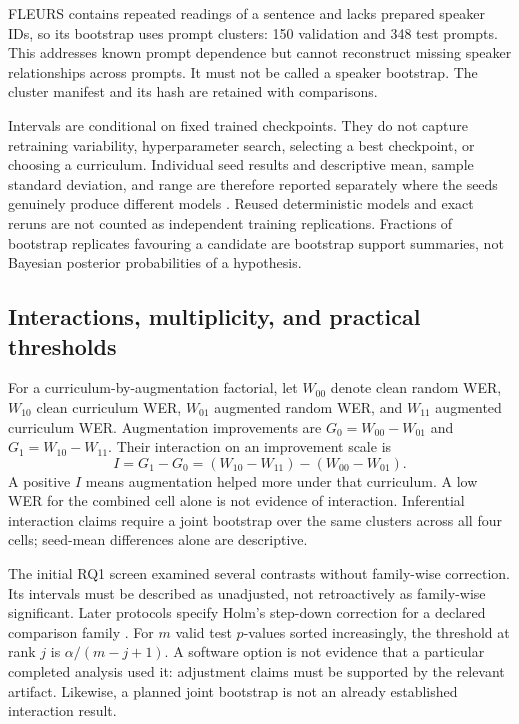 \documentclass[12pt,a4paper]{report}
\newcommand{\code}[1]{\texttt{\detokenize{#1}}}
\begin{document}
FLEURS contains repeated readings of a sentence and lacks prepared speaker IDs, so its bootstrap uses \code{source_id} prompt clusters: 150 validation and 348 test prompts. This addresses known prompt dependence but cannot reconstruct missing speaker relationships across prompts. It must not be called a speaker bootstrap. The cluster manifest and its hash are retained with comparisons.

Intervals are conditional on fixed trained checkpoints. They do not capture retraining variability, hyperparameter search, selecting a best checkpoint, or choosing a curriculum. Individual seed results and descriptive mean, sample standard deviation, and range are therefore reported separately where the seeds genuinely produce different models \citep{Reimers2017}. Reused deterministic models and exact reruns are not counted as independent training replications. Fractions of bootstrap replicates favouring a candidate are bootstrap support summaries, not Bayesian posterior probabilities of a hypothesis.

\subsection{Interactions, multiplicity, and practical thresholds}

For a curriculum-by-augmentation factorial, let $W_{00}$ denote clean random WER, $W_{10}$ clean curriculum WER, $W_{01}$ augmented random WER, and $W_{11}$ augmented curriculum WER. Augmentation improvements are $G_0=W_{00}-W_{01}$ and $G_1=W_{10}-W_{11}$. Their interaction on an improvement scale is
\begin{equation}I=G_1-G_0=(W_{10}-W_{11})-(W_{00}-W_{01}).\end{equation}
A positive $I$ means augmentation helped more under that curriculum. A low WER for the combined cell alone is not evidence of interaction. Inferential interaction claims require a joint bootstrap over the same clusters across all four cells; seed-mean differences alone are descriptive.

The initial RQ1 screen examined several contrasts without family-wise correction. Its intervals must be described as unadjusted, not retroactively as family-wise significant. Later protocols specify Holm's step-down correction for a declared comparison family \citep{Holm1979}. For $m$ valid test $p$-values sorted increasingly, the threshold at rank $j$ is $\alpha/(m-j+1)$. A software option is not evidence that a particular completed analysis used it: adjustment claims must be supported by the relevant artifact. Likewise, a planned joint bootstrap is not an already established interaction result.
\end{document}
